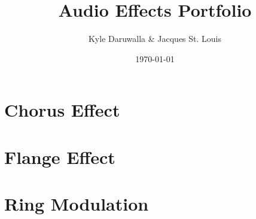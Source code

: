 \documentclass{article}
\title{Audio Effects Portfolio}
\author{Kyle Daruwalla \& Jacques St. Louis}
\date{\today}
\begin{document}
\maketitle

\section{Chorus Effect}


\section{Flange Effect}


\section{Ring Modulation}

\end{document}
